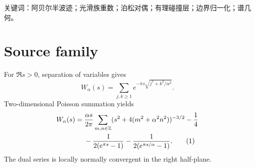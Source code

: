\documentclass[10pt]{article}
\begin{document}
{{关\hspace{0pt}键\hspace{0pt}词：阿\hspace{0pt}贝\hspace{0pt}尔\hspace{0pt}半\hspace{0pt}波\hspace{0pt}迹；\allowbreak 光\hspace{0pt}滑\hspace{0pt}族\hspace{0pt}重\hspace{0pt}数；\allowbreak 泊\hspace{0pt}松\hspace{0pt}对\hspace{0pt}偶；\allowbreak 有\hspace{0pt}理\hspace{0pt}碰\hspace{0pt}撞\hspace{0pt}层；\allowbreak 边\hspace{0pt}界\hspace{0pt}归\hspace{0pt}一\hspace{0pt}化；\allowbreak 谱\hspace{0pt}几\hspace{0pt}何。}}

\section{Source family}
For $\Re s>0$, separation of variables gives
\[
W_\alpha(s)=\sum_{j,k\ge1}e^{-\pi s\sqrt{j^2+k^2/\alpha^2}}.
\]
Two-dimensional Poisson summation yields
\begin{align}
W_\alpha(s)={}&\frac{\alpha s}{2\pi}\sum_{m,n\in\mathbb Z}
 (s^2+4(m^2+\alpha^2n^2))^{-3/2}-\frac14 \notag\\
&-\frac1{2(e^{\pi s}-1)}-\frac1{2(e^{\pi s/\alpha}-1)}. \tag{1}
\end{align}
The dual series is locally normally convergent in the right half-plane.
\end{document}
